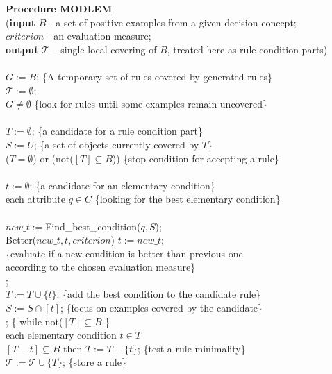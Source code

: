 \documentclass{llncs}
\begin{document}
\begin{algo}
\< \< {\bf Procedure MODLEM} \\ \< \< (\textbf{input}   $B$ - a set of
positive examples from a given decision concept;\\ \<  $criterion$ - an
evaluation measure;\\ \< \< \textbf{output} $\mathcal{T}$ -- single local
covering of $B$, treated here as rule condition parts) \\ \< \< \B
\\
 \<  $G:=B$; \{A temporary set of rules covered by generated rules\}
 \\ \<
$\mathcal{T}:=\emptyset$;\\ \< \WHILE $G \neq \emptyset$ \DO \{look for
rules until some examples remain uncovered\}
\\ \< \B
\\
 $T:=\emptyset$;  \{a candidate for a rule condition part\}\\
 $S:=U$; \{a set of objects currently covered by $T$\} \\
 \WHILE ($T=\emptyset$) or (not($\left[ T \right] \subseteq B$)) \DO
\{stop condition for accepting a rule\}
 \\
 \B \\
 \> $t:=\emptyset$;  \{a candidate for an elementary condition\} \\
 \> \FOR each  attribute $q \in C$ \DO \{looking for the best elementary condition\}\\
 \> \B \\
 \> \> $new\_t:=$Find\_best\_condition($q,S$);\\
 \> \> \IF Better($new\_t,t,criterion$) \THEN $t:=new\_t$;\\
\> \> \{evaluate if a new condition is better than previous one\\ \> \>
according to the chosen evaluation measure\}
\\
 \> \E; \\
 \> $T:=T \cup \{ t \} $; \{add the best condition to the candidate rule\}\\
 \> $S:= S \cap \left[ t \right] $; \{focus on examples covered by the candidate\}\\
 \E; \{ while not($\left[ T \right] \subseteq B$ \} \\
\FOR each elementary condition $t \in T$ \DO \\ \> \IF $\left[T-{t}\right]
\subseteq B$ then $T:=T-\{t\}$; \{test a rule minimality\}\\
 $\mathcal{T}:= \mathcal{T} \cup \{ T \} $; \{store a rule\}\\

\end{algo}
\end{document}

